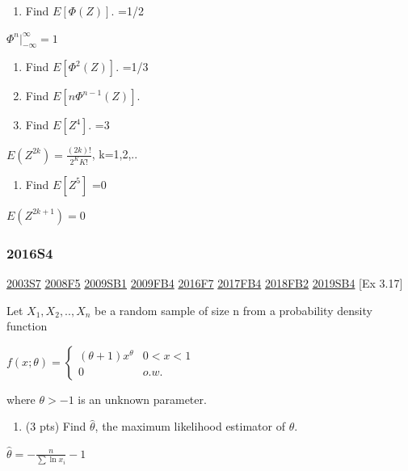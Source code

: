\documentclass[6pt,Portrait]{article}
\providecommand{\tightlist}{%
  \setlength{\itemsep}{0pt}\setlength{\parskip}{0pt}}
\begin{document}
\begin{enumerate}
\def\labelenumi{(\alph{enumi})}
\tightlist
\item
  Find \(E[\Phi(Z)]\). =1/2
\end{enumerate}

\(\Phi^n |_{-\infty}^{\infty}=1\)

\begin{enumerate}
\def\labelenumi{(\alph{enumi})}
\setcounter{enumi}{1}
\item
  Find \(E[\Phi^{2}(Z)]\). =1/3
\item
  Find \(E[n\Phi^{n-1}(Z)]\).
\item
  Find \(E[Z^4]\). =3
\end{enumerate}

\(E(Z^{2k})=\frac{(2k)!}{2^KK!}\), k=1,2,..

\begin{enumerate}
\def\labelenumi{(\alph{enumi})}
\setcounter{enumi}{4}
\tightlist
\item
  Find \(E[Z^5]\) =0
\end{enumerate}

\(E(Z^{2k+1})=0\)

\hypertarget{s4-4}{%
\subsubsection{2016S4}\label{s4-4}}

\protect\hyperlink{s7}{2003S7} \protect\hyperlink{f5-3}{2008F5}
\protect\hyperlink{sb1}{2009SB1} \protect\hyperlink{fb4}{2009FB4}
\protect\hyperlink{f7-5}{2016F7} \protect\hyperlink{fb4-3}{2017FB4}
\protect\hyperlink{fb2-4}{2018FB2} \protect\hyperlink{sb4-2}{2019SB4}
{[}Ex 3.17{]}

Let \(X_1,X_2,..,X_n\) be a random sample of size n from a probability
density function

\(f(x;\theta)=\begin{cases}(\theta+1)x^\theta& 0<x<1\\0& o.w.\end{cases}\)

where \(\theta>-1\) is an unknown parameter.

\begin{enumerate}
\def\labelenumi{(\alph{enumi})}
\tightlist
\item
  (3 pts) Find \(\hat\theta\), the maximum likelihood estimator of
  \(\theta\).
\end{enumerate}

\(\hat\theta=-\frac{n}{\sum\ln x_i}-1\)
\end{document}
